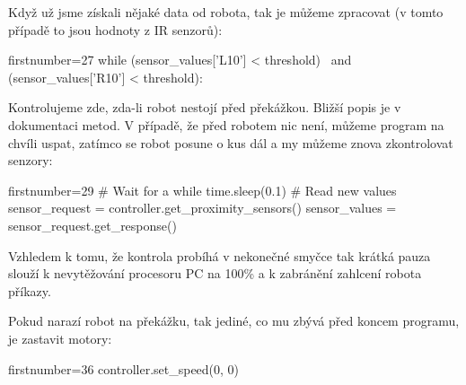     Když už jsme získali nějaké data od robota, tak je můžeme zpracovat (v
    tomto případě to jsou hodnoty z IR senzorů):

    \begin{pyc*}{firstnumber=27}
while (sensor_values['L10'] < threshold) \
       and (sensor_values['R10'] < threshold):
    \end{pyc*}

    Kontrolujeme zde, zda-li  robot nestojí před překážkou. Bližší popis je v
    dokumentaci metod. V případě, že před robotem nic není, můžeme program na
    chvíli uspat, zatímco se robot posune o kus dál a my můžeme znova
    zkontrolovat senzory:

    \begin{pyc*}{firstnumber=29}
    # Wait for a while
    time.sleep(0.1)
    # Read new values
    sensor_request = controller.get_proximity_sensors()
    sensor_values = sensor_request.get_response()
    \end{pyc*}

    Vzhledem k tomu, že kontrola probíhá v nekonečné smyčce tak krátká pauza
    slouží k nevytěžování procesoru PC na 100\% a k zabránění zahlcení robota
    příkazy.

    Pokud narazí robot na překážku, tak jediné, co mu zbývá před koncem
    programu, je zastavit motory:

    \begin{pyc*}{firstnumber=36}
    controller.set_speed(0, 0)
    \end{pyc*}
